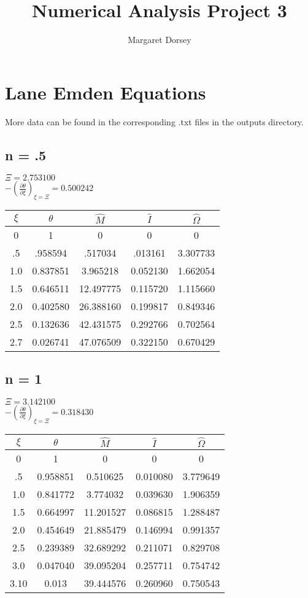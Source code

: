 \documentclass[11pt]{article} %
\title{Numerical Analysis Project 3}
\author{Margaret Dorsey}
\newcommand{\pder}[2][]{\frac{\partial#1}{\partial#2}}
\begin{document}
\maketitle

\section*{Lane Emden Equations}

More data can be found in the corresponding .txt files in the outputs directory. \\

\subsection*{n = .5}

$\Xi = 2.753100$ \\
$-\left(\pder[\theta]{\xi}\right)_{\xi = \Xi} = 0.500242$\\

\begin{tabular}{| c | c c c c |}
\hline
$\xi$ & $\theta$ & $\hat{M}$ &  $\hat{I}$  & $\hat{\Omega}$ \\
\hline
0 & 1 & 0 & 0 & 0 \\
.5 & .958594 & .517034 & .013161 & 3.307733\\
1.0 & 0.837851 &  3.965218 & 0.052130 & 1.662054\\
1.5 & 0.646511 & 12.497775 & 0.115720 & 1.115660\\
2.0 & 0.402580 & 26.388160 & 0.199817 & 0.849346\\
2.5 & 0.132636 & 42.431575 & 0.292766 & 0.702564\\
2.7 & 0.026741 & 47.076509 & 0.322150 & 0.670429\\
\hline
\end{tabular}

\subsection*{n = 1}
$\Xi = 3.142100$ \\
$-\left(\pder[\theta]{\xi}\right)_{\xi = \Xi} =0.318430$\\

\begin{tabular}{| c | c c c c |}
\hline
$\xi$ & $\theta$ & $\hat{M}$ &  $\hat{I}$  & $\hat{\Omega}$ \\
\hline
0 & 1 & 0 & 0 & 0 \\
.5 & 0.958851 & 0.510625 & 0.010080 & 3.779649\\
1.0 & 0.841772 & 3.774032 &0.039630 & 1.906359\\
1.5 &0.664997 & 11.201527 &0.086815 & 1.288487\\
2.0 & 0.454649 & 21.885479 & 0.146994 & 0.991357\\
2.5 & 0.239389 & 32.689292 & 0.211071 & 0.829708\\
3.0 & 0.047040 & 39.095204 & 0.257711 & 0.754742\\
3.10 & 0.013 & 39.444576 & 0.260960 & 0.750543\\
\hline
\end{tabular}
\end{document}

